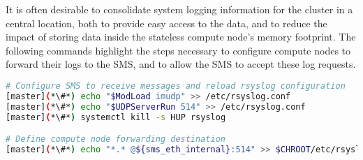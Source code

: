 It is often desirable to consolidate system logging information for the cluster in a
central location, both to provide easy access to the data, and to reduce the
impact of storing data inside the stateless compute node's memory footprint. The
following commands highlight the steps necessary to configure compute nodes to
forward their logs to the SMS, and to allow the SMS to accept these log requests.


\begin{lstlisting}[language=bash,keywords={}]
# Configure SMS to receive messages and reload rsyslog configuration
[master](*\#*) echo "$ModLoad imudp" >> /etc/rsyslog.conf
[master](*\#*) echo "$UDPServerRun 514" >> /etc/rsyslog.conf
[master](*\#*) systemctl kill -s HUP rsyslog

# Define compute node forwarding destination
[master](*\#*) echo "*.* @${sms_eth_internal}:514" >> $CHROOT/etc/rsyslog.conf
\end{lstlisting}
